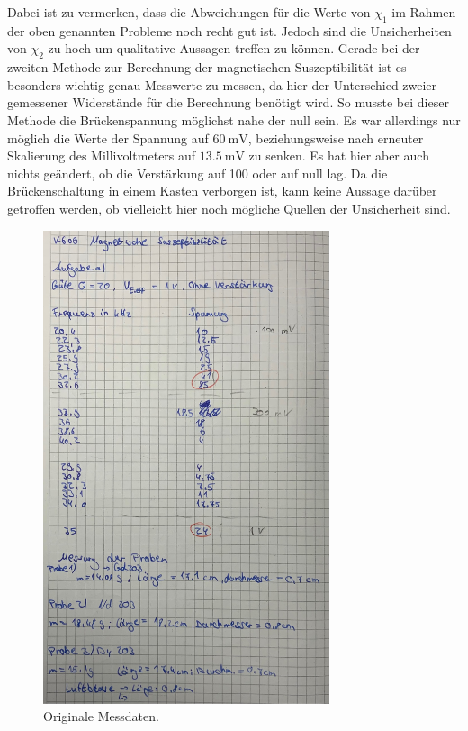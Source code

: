 \noindent
Dabei ist zu vermerken, dass die Abweichungen für die Werte von $\chi_1$ im Rahmen der oben genannten Probleme noch recht gut ist. Jedoch sind die Unsicherheiten von $\chi_2$ zu hoch um qualitative Aussagen treffen zu können.
Gerade bei der zweiten Methode zur Berechnung der magnetischen Suszeptibilität ist es besonders wichtig genau Messwerte zu messen, da hier der Unterschied zweier gemessener Widerstände für die Berechnung benötigt wird. So musste bei dieser Methode
die Brückenspannung möglichst nahe der null sein. Es war allerdings nur möglich die Werte der Spannung auf $\SI{60}{\milli\volt}$, beziehungsweise nach erneuter Skalierung des Millivoltmeters auf
$\SI{13,5}{\milli\volt}$ zu senken. Es hat hier aber auch nichts geändert, ob die Verstärkung auf 100 oder auf null lag.
Da die Brückenschaltung in einem Kasten verborgen ist, kann keine Aussage darüber getroffen werden, ob vielleicht hier noch mögliche Quellen der Unsicherheit sind.

\begin{figure}[H]
    \centering
    \includegraphics[width=0.75\textwidth]{data/origDaten1.jpg}
    \caption{Originale Messdaten.}
    \label{fig:daten1}
\end{figure}

